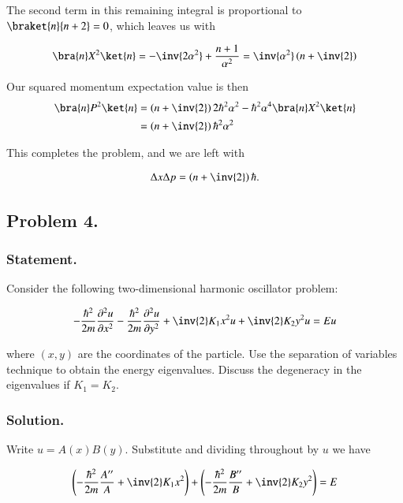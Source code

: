 The second term in this remaining integral is proportional to $\braket{n}{n+2} = 0$, which leaves us with

\begin{align}\label{eqn:desaiCh9:310}
\bra{n} X^2 \ket{n}
=
-\inv{2 \alpha^2} + \frac{n+1}{\alpha^2} = \inv{\alpha^2}\left( n + \inv{2} \right)
\end{align}

Our squared momentum expectation value is then
\begin{align*}
\bra{n} P^2 \ket{n}
&=
\left( n + \inv{2} \right) 2 \hbar^2 \alpha^2 
- \hbar^2 \alpha^4 \bra{n} X^2 \ket{n} \\
&=
\left( n + \inv{2} \right) \hbar^2 \alpha^2 
\end{align*}

This completes the problem, and we are left with

\begin{align}\label{eqn:desaiCh9:320}
\Delta x \Delta p = \left( n + \inv{2} \right) \hbar.
\end{align}

\subsection{Problem 4.}
\subsubsection{Statement.}

Consider the following two-dimensional harmonic oscillator problem:

\begin{align}\label{eqn:desaiCh9:400}
-\frac{\hbar^2}{2m} \frac{\partial^2 u}{\partial x^2}
-\frac{\hbar^2}{2m} \frac{\partial^2 u}{\partial y^2}
+ \inv{2} K_1 x^2 u
+ \inv{2} K_2 y^2 u
= E u
\end{align}

where $(x,y)$ are the coordinates of the particle.  Use the separation of variables technique to obtain the energy eigenvalues.  Discuss the degeneracy in the eigenvalues if $K_1 = K_2$.

\subsubsection{Solution.}

Write $u = A(x) B(y)$.  Substitute and dividing throughout by $u$ we have

\begin{align}\label{eqn:desaiCh9:401}
\left( -\frac{\hbar^2}{2m} \frac{A''}{A} + \inv{2} K_1 x^2 \right)
+\left( -\frac{\hbar^2}{2m} \frac{B''}{B} + \inv{2} K_2 y^2 \right)
= E
\end{align}

